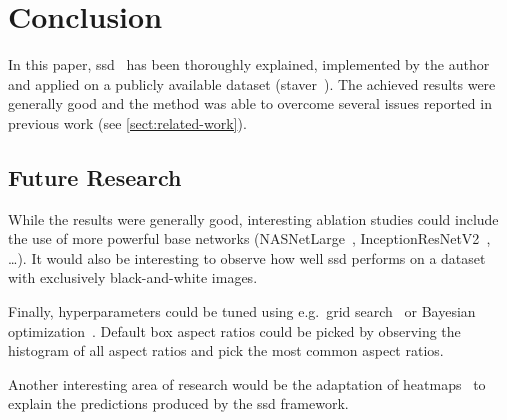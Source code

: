 \section{Conclusion}
In this paper, \gls{ssd}~\cite{Liu.2016} has been thoroughly explained, implemented
by the author and applied on a publicly available dataset (\gls{staver}~\cite{Micenkova.2015}).
The achieved results were generally good and the method was able to overcome
several issues reported in previous work (see \cref{sect:related-work}).

\subsection{Future Research}
While the results were generally good, interesting ablation studies could include
the use of more powerful base networks (NASNetLarge~\cite{Zoph.2018},
InceptionResNetV2~\cite{Singh.2017}, \ldots). It would also be interesting to
observe how well \gls{ssd} performs on a dataset with exclusively black-and-white
images.

Finally, hyperparameters could be tuned using e.g.\ grid search~\cite[432-434]{Goodfellow.2016}
or Bayesian optimization~\cite{Agnihotri.2020}. Default box aspect ratios could
be picked by observing the histogram of all aspect ratios and pick the 
most common aspect ratios.

Another interesting area of research would be the adaptation of heatmaps~\cite{Marban.2021}
to explain the predictions produced by the \gls{ssd} framework.